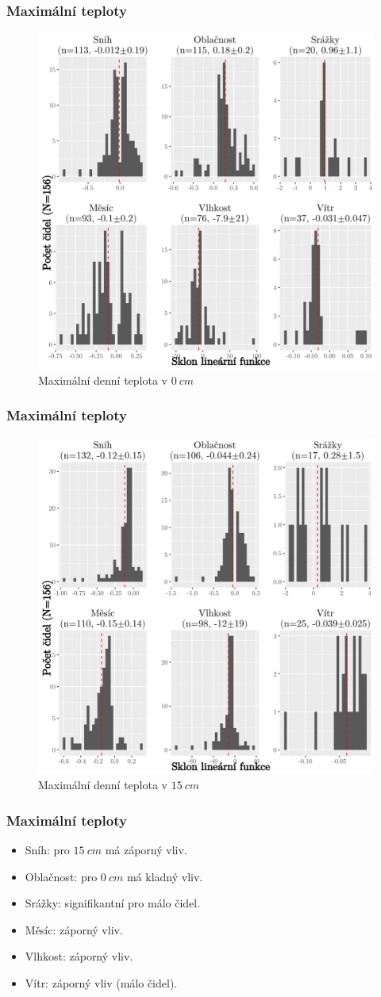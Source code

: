 \documentclass[
	11pt, %
]{beamer}
\begin{document}
\begin{frame}
	\frametitle{Maximální teploty}
	\begin{figure}
		\includegraphics[width=0.8\linewidth,height=0.6\textwidth]{all156maxTall0cm_BWyes.png}
		\caption{Maximální denní teplota v $\SI{0}{cm}$}
	\end{figure}
\end{frame}

\begin{frame}
	\frametitle{Maximální teploty}
	\begin{figure}
		\includegraphics[width=0.8\linewidth,height=0.6\textwidth]{all156maxTall15cm_BWyes.png}
		\caption{Maximální denní teplota v $\SI{15}{cm}$}
	\end{figure}
\end{frame}

\begin{frame}
	\frametitle{Maximální teploty}
	\begin{itemize}
		\item Sníh: pro $\SI{15}{cm}$ má záporný vliv.
		\item Oblačnost: pro $\SI{0}{cm}$ má kladný vliv.
		\item Srážky: signifikantní pro málo čidel.
		\item Měsíc: záporný vliv.
		\item Vlhkost: záporný vliv.
		\item Vítr: záporný vliv (málo čidel).
	\end{itemize}
\end{frame}
\end{document}
